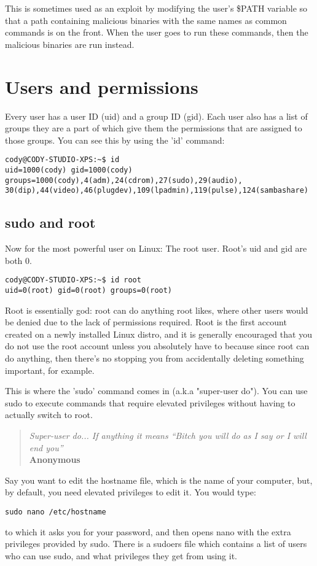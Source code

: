 \documentclass{article}
\begin{document}
This is sometimes used as an exploit by modifying the user's \$PATH variable so that a path containing malicious binaries with the same names as common commands is on the front. When the user goes to run these commands, then the malicious binaries are run instead.

\section{Users and permissions}
Every user has a user ID (uid) and a group ID (gid). Each user also has a list of groups they are a part of which give them the permissions that are assigned to those groups. You can see this by using the 'id' command:
\begin{verbatim}
cody@CODY-STUDIO-XPS:~$ id
uid=1000(cody) gid=1000(cody) groups=1000(cody),4(adm),24(cdrom),27(sudo),29(audio),
30(dip),44(video),46(plugdev),109(lpadmin),119(pulse),124(sambashare)
\end{verbatim}

\subsection{sudo and root}
Now for the most powerful user on Linux: The root user. Root's uid and gid are both 0.
\begin{verbatim}
cody@CODY-STUDIO-XPS:~$ id root
uid=0(root) gid=0(root) groups=0(root)
\end{verbatim}
Root is essentially god: root can do anything root likes, where other users would be denied due to the lack of permissions required. Root is the first account created on a newly installed Linux distro, and it is generally encouraged that you do not use the root account unless you absolutely have to because since root can do anything, then there's no stopping you from accidentally deleting something important, for example.

This is where the 'sudo' command comes in (a.k.a "super-user do"). You can use sudo to execute commands that require elevated privileges without having to actually switch to root.
\begin{quote}
\textit{
Super-user do... If anything it means ``Bitch you will do as I say or I will end you''\\
}
\textbf{Anonymous}
\end{quote}
Say you want to edit the hostname file, which is the name of your computer, but, by default, you need elevated privileges to edit it. You would type:
\begin{verbatim}
sudo nano /etc/hostname
\end{verbatim}
to which it asks you for your password, and then opens nano with the extra privileges provided by sudo. There is a sudoers file which contains a list of users who can use sudo, and what privileges they get from using it.
\end{document}
